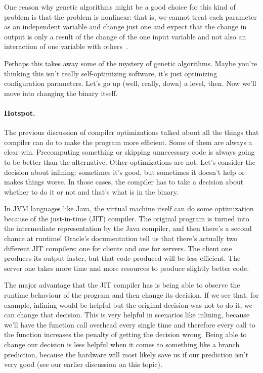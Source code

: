 \documentclass[a4paper]{report}
\begin{document}
One reason why genetic algorithms might be a good choice for this kind of problem is that the problem is nonlinear: that is, we cannot treat each parameter as an independent variable and change just one and expect that the change in output is only a result of the change of the one input variable and not also an interaction of one variable with others~\cite{genetic}.

Perhaps this takes away some of the mystery of genetic algorithms. Maybe you're thinking this isn't really self-optimizing software, it's just optimizing configuration parameters. Let's go up (well, really, down) a level, then. Now we'll move into changing the binary itself.

\paragraph{Hotspot.}
The previous discussion of compiler optimizations talked about all the things that compiler can do to make the program more efficient. Some of them are always a clear win. Precomputing something or skipping unnecessary code is always going to be better than the alternative. Other optimizations are not. Let's consider the decision about inlining: sometimes it's good, but sometimes it doesn't help or makes things worse. In those cases, the compiler has to take a decision about whether to do it or not and that's what is in the binary.

In JVM languages like Java, the virtual machine itself can do some optimization because of the just-in-time (JIT) compiler. The original program is turned into the intermediate representation by the Java compiler, and then there's a second chance at runtime! Oracle's documentation tell us that there's actually two different JIT compilers; one for clients and one for servers. The client one produces its output faster, but that code produced will be less efficient. The server one takes more time and more resources to produce slightly better code.

The major advantage that the JIT compiler has is being able to observe the runtime behaviour of the program and then change its decision. If we see that, for example, inlining would be helpful but the original decision was not to do it, we can change that decision. This is very helpful in scenarios like inlining, because we'll have the function call overhead every single time and therefore every call to the function increases the penalty of getting the decision wrong. Being able to change our decision is less helpful when it comes to something like a branch prediction, because the hardware will most likely save us if our prediction isn't very good (see our earlier discussion on this topic).
\end{document}
